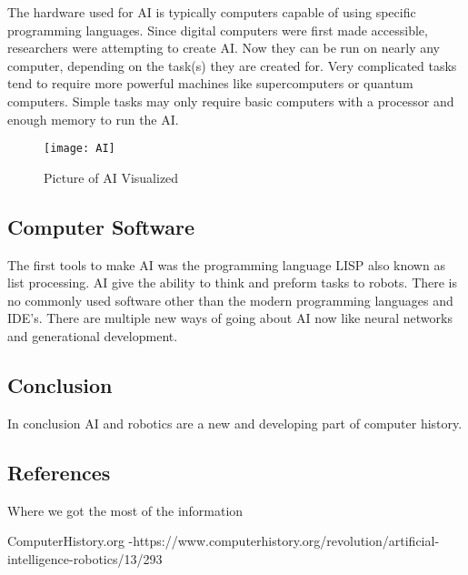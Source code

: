 \documentclass[11pt, twocolumn]{article}
\begin{document}
The hardware used for AI is typically computers capable of using specific programming
languages. Since digital computers were first made accessible, researchers were
attempting to create AI. Now they can be run on nearly any computer, depending on the
task(s) they are created for. Very complicated tasks tend to require more powerful
machines like supercomputers or quantum computers. Simple tasks may only require
basic computers with a processor and enough memory to run the AI.

\begin{figure}
    \centering
    \texttt{[image: AI]}
    \caption{Picture of AI Visualized}
    \label{fig:AI}
\end{figure}

\subsection{Computer Software}
The first tools to make AI was the programming language LISP also known as list
processing. AI give the ability to think and preform tasks to robots. There is no
commonly used software other than the modern programming languages and IDE's. There
are multiple new ways of going about AI now like neural networks and generational
development.

\subsection{Conclusion}
In conclusion AI and robotics are a new and developing part of computer history. 




\subsection{References}
Where we got the most of the information

ComputerHistory.org 
-https://www.computerhistory.org/revolution/artificial-intelligence-robotics/13/293
\end{document}
